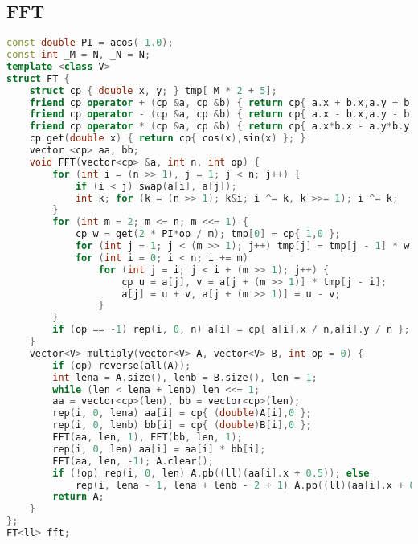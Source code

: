 \subsection{FFT}
\begin{lstlisting}[language=C++]
const double PI = acos(-1.0);
const int _M = N, _N = N;
template <class V>
struct FT {
	struct cp { double x, y; } tmp[_M * 2 + 5];
	friend cp operator + (cp &a, cp &b) { return cp{ a.x + b.x,a.y + b.y }; }
	friend cp operator - (cp &a, cp &b) { return cp{ a.x - b.x,a.y - b.y }; }
	friend cp operator * (cp &a, cp &b) { return cp{ a.x*b.x - a.y*b.y,a.x*b.y + a.y*b.x }; }
	cp get(double x) { return cp{ cos(x),sin(x) }; }
	vector <cp> aa, bb;
	void FFT(vector<cp> &a, int n, int op) {
		for (int i = (n >> 1), j = 1; j < n; j++) {
			if (i < j) swap(a[i], a[j]);
			int k; for (k = (n >> 1); k&i; i ^= k, k >>= 1); i ^= k;
		}
		for (int m = 2; m <= n; m <<= 1) {
			cp w = get(2 * PI*op / m); tmp[0] = cp{ 1,0 };
			for (int j = 1; j < (m >> 1); j++) tmp[j] = tmp[j - 1] * w;
			for (int i = 0; i < n; i += m)
				for (int j = i; j < i + (m >> 1); j++) {
					cp u = a[j], v = a[j + (m >> 1)] * tmp[j - i];
					a[j] = u + v, a[j + (m >> 1)] = u - v;
				}
		}
		if (op == -1) rep(i, 0, n) a[i] = cp{ a[i].x / n,a[i].y / n };
	}
	vector<V> multiply(vector<V> A, vector<V> B, int op = 0) {
		if (op) reverse(all(A));
		int lena = A.size(), lenb = B.size(), len = 1;
		while (len < lena + lenb) len <<= 1;
		aa = vector<cp>(len), bb = vector<cp>(len);
		rep(i, 0, lena) aa[i] = cp{ (double)A[i],0 };
		rep(i, 0, lenb) bb[i] = cp{ (double)B[i],0 };
		FFT(aa, len, 1), FFT(bb, len, 1);
		rep(i, 0, len) aa[i] = aa[i] * bb[i];
		FFT(aa, len, -1); A.clear();
		if (!op) rep(i, 0, len) A.pb((ll)(aa[i].x + 0.5)); else
			rep(i, lena - 1, lena + lenb - 2 + 1) A.pb((ll)(aa[i].x + 0.5));
		return A;
	}
};
FT<ll> fft;
\end{lstlisting}
